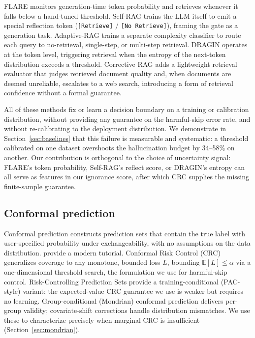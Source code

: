 \documentclass[a4paper,fleqn]{cas-dc}
\begin{document}
FLARE \citep{jiang2023flare} monitors generation-time token probability and
retrieves whenever it falls below a hand-tuned threshold. Self-RAG
\citep{asai2024selfrag} trains the LLM itself to emit a special reflection token
(\texttt{[Retrieve]} / \texttt{[No Retrieve]}), framing the gate as a generation
task. Adaptive-RAG \citep{jeong2024adaptiverag} trains a separate complexity
classifier to route each query to no-retrieval, single-step, or multi-step
retrieval. DRAGIN \citep{su2024dragin} operates at the token level, triggering
retrieval when the entropy of the next-token distribution exceeds a threshold.
Corrective RAG \citep{yan2024crag} adds a lightweight retrieval evaluator that
judges retrieved document quality and, when documents are deemed unreliable,
escalates to a web search, introducing a form of retrieval confidence without
a formal guarantee.

All of these methods fix or learn a decision boundary on a training or
calibration distribution, without providing any guarantee on the harmful-skip
error rate, and without re-calibrating to the deployment distribution. We
demonstrate in Section~\ref{sec:baselines} that this failure is measurable and
systematic: a threshold calibrated on one dataset overshoots the hallucination
budget by 34--58\% on another. Our contribution is orthogonal to the choice of
uncertainty signal: FLARE's token probability, Self-RAG's reflect score, or
DRAGIN's entropy can all serve as features in our ignorance score, after which
CRC supplies the missing finite-sample guarantee.

\subsection{Conformal prediction}

Conformal prediction \citep{vovk2005algorithmic} constructs prediction sets that
contain the true label with user-specified probability under exchangeability,
with no assumptions on the data distribution. \citet{angelopoulos2023gentle}
provide a modern tutorial. Conformal Risk Control (CRC)
\citep{angelopoulos2024crc} generalizes coverage to any monotone, bounded loss
$L$, bounding $\mathbb E[L]\le\alpha$ via a one-dimensional threshold search, the
formulation we use for harmful-skip control. Risk-Controlling Prediction Sets
\citep{bates2021riskcontrolling} provide a training-conditional (PAC-style)
variant; the expected-value CRC guarantee we use is weaker but requires no
learning. Group-conditional (Mondrian) conformal prediction
\citep{vovk2012conditional} delivers per-group validity; covariate-shift
corrections \citep{tibshirani2019covariate} handle distribution mismatches. We
use these to characterize precisely when marginal CRC is insufficient
(Section~\ref{sec:mondrian}).
\end{document}

